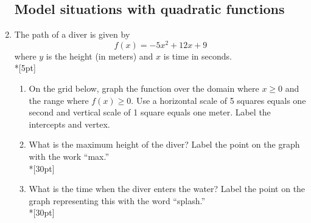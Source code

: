 \documentclass[12pt, twoside]{article}
\begin{document}
\begin{enumerate}
    \begin{flushright}
      \end{flushright}
    
    
    \newpage
    \subsection*{Model situations with quadratic functions}
    \item The path of a diver is given by 
    \[f(x)=-5x^2+12x+9\]
    where $y$ is the height (in meters) and $x$ is time in seconds.\\*[5pt]
    \begin{enumerate}
        \item On the grid below, graph the function over the domain where $x\geq 0$ and the range where $f(x) \geq 0$. Use a horizontal scale of 5 squares equals one second and vertical scale of 1 square equals one meter. Label the intercepts and vertex.
        \item What is the maximum height of the diver? Label the point on the graph with the work ``max.''\\*[30pt]
        \item What is the time when the diver enters the water? Label the point on the graph representing this with the word ``splash.''\\*[30pt]
    \end{enumerate}
    
    \begin{flushright}
      \end{flushright}
    
           
\end{enumerate}
\end{document}
